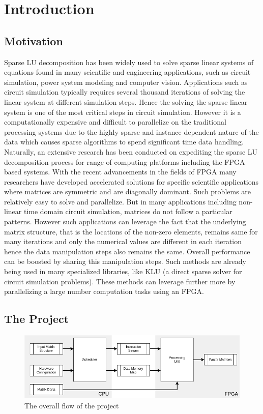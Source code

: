 \chapter{Introduction}
\section{Motivation}
Sparse LU decomposition has been widely used to solve sparse linear systems of equations found in many scientific
and engineering applications, such as circuit simulation, power system modeling and computer vision.
Applications such as circuit simulation typically requires several thousand iterations
of solving the linear system at different simulation steps. Hence the
solving the sparse linear system is one of the most critical steps in circuit simulation.
However it is a computationally expensive and difficult to parallelize on the traditional
processing systems due to the highly sparse and instance dependent nature of the data which causes sparse 
algorithms to spend significant time data handling.\\
Naturally, an extensive research has been conducted on expediting the sparse LU 
decomposition process for range of computing platforms including the FPGA based systems.
With the recent advancements in the fields of FPGA many researchers have developed 
accelerated solutions for specific scientific applications where matrices are 
symmetric and are diagonally dominant. Such problems are relatively easy to solve and parallelize. 
But in many applications including non-linear time domain circuit simulation, 
matrices do not follow a particular patterns. However such applications
can leverage the fact that the underlying matrix structure, that is the locations of the non-zero elements,
remains same for many iterations and only the numerical values are different in each iteration hence the
data manipulation steps also remains the same. Overall performance can be 
boosted by sharing this manipulation steps. Such methods are already being used 
in many specialized libraries, like KLU (a direct sparse solver for circuit simulation problems).
These methods can leverage further more by parallelizing a large number computation tasks 
using an FPGA.
\section{The Project}

\begin{figure}
    \centering
    \includegraphics[width = 0.9\linewidth]{./Introduction/projectOverView.png}
    \caption{The overall flow of the project}
    \label{fig:Intro:flow}
\end{figure}


